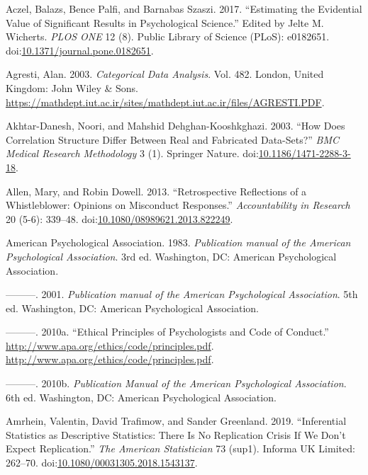 \documentclass[a5paper]{book}
\begin{document}
\hypertarget{ref-doi:10.1371ux2fjournal.pone.0182651}{}
Aczel, Balazs, Bence Palfi, and Barnabas Szaszi. 2017. ``Estimating the
Evidential Value of Significant Results in Psychological Science.''
Edited by Jelte M. Wicherts. \emph{PLOS ONE} 12 (8). Public Library of
Science (PLoS): e0182651.
doi:\href{https://doi.org/10.1371/journal.pone.0182651}{10.1371/journal.pone.0182651}.

\hypertarget{ref-isbn:0471360937}{}
Agresti, Alan. 2003. \emph{Categorical Data Analysis}. Vol. 482. London,
United Kingdom: John Wiley \& Sons.
\url{https://mathdept.iut.ac.ir/sites/mathdept.iut.ac.ir/files/AGRESTI.PDF}.

\hypertarget{ref-doi:10.1186ux2f1471-2288-3-18}{}
Akhtar-Danesh, Noori, and Mahshid Dehghan-Kooshkghazi. 2003. ``How Does
Correlation Structure Differ Between Real and Fabricated Data-Sets?''
\emph{BMC Medical Research Methodology} 3 (1). Springer Nature.
doi:\href{https://doi.org/10.1186/1471-2288-3-18}{10.1186/1471-2288-3-18}.

\hypertarget{ref-doi:10.1080ux2f08989621.2013.822249}{}
Allen, Mary, and Robin Dowell. 2013. ``Retrospective Reflections of a
Whistleblower: Opinions on Misconduct Responses.'' \emph{Accountability
in Research} 20 (5-6): 339--48.
doi:\href{https://doi.org/10.1080/08989621.2013.822249}{10.1080/08989621.2013.822249}.

\hypertarget{ref-American_Psychological_Association1983-yf}{}
American Psychological Association. 1983. \emph{Publication manual of
the American Psychological Association}. 3rd ed. Washington, DC:
American Psychological Association.

\hypertarget{ref-American_Psychological_Association2001-uw}{}
---------. 2001. \emph{Publication manual of the American Psychological
Association}. 5th ed. Washington, DC: American Psychological
Association.

\hypertarget{ref-apa2010}{}
---------. 2010a. ``Ethical Principles of Psychologists and Code of
Conduct.'' \url{http://www.apa.org/ethics/code/principles.pdf}.
\url{http://www.apa.org/ethics/code/principles.pdf}.

\hypertarget{ref-isbn:9781433805615}{}
---------. 2010b. \emph{Publication Manual of the American Psychological
Association}. 6th ed. Washington, DC: American Psychological
Association.

\hypertarget{ref-doi:10.1080ux2f00031305.2018.1543137}{}
Amrhein, Valentin, David Trafimow, and Sander Greenland. 2019.
``Inferential Statistics as Descriptive Statistics: There Is No
Replication Crisis If We Don't Expect Replication.'' \emph{The American
Statistician} 73 (sup1). Informa UK Limited: 262--70.
doi:\href{https://doi.org/10.1080/00031305.2018.1543137}{10.1080/00031305.2018.1543137}.
\end{document}

